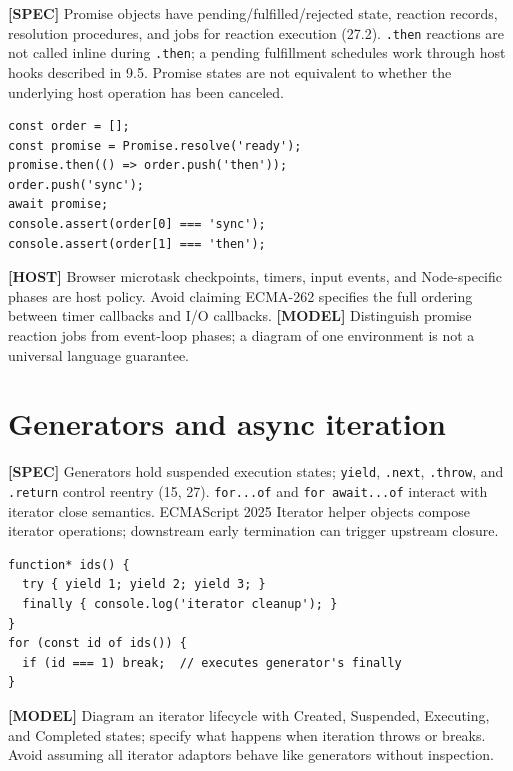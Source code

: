 \documentclass[11pt,letterpaper]{article}
\newcommand{\passthrough}[1]{#1}
\begin{document}
\textbf{{[}SPEC{]}} Promise objects have pending/fulfilled/rejected state, reaction records, resolution procedures, and jobs for reaction execution (27.2). \passthrough{\lstinline!.then!} reactions are not called inline during \passthrough{\lstinline!.then!}; a pending fulfillment schedules work through host hooks described in 9.5. Promise states are not equivalent to whether the underlying host operation has been canceled.

\begin{lstlisting}
const order = [];
const promise = Promise.resolve('ready');
promise.then(() => order.push('then'));
order.push('sync');
await promise;
console.assert(order[0] === 'sync');
console.assert(order[1] === 'then');
\end{lstlisting}

\textbf{{[}HOST{]}} Browser microtask checkpoints, timers, input events, and Node-specific phases are host policy. Avoid claiming ECMA-262 specifies the full ordering between timer callbacks and I/O callbacks. \textbf{{[}MODEL{]}} Distinguish promise reaction jobs from event-loop phases; a diagram of one environment is not a universal language guarantee.

\section{Generators and async iteration}\label{generators-and-async-iteration}

\textbf{{[}SPEC{]}} Generators hold suspended execution states; \passthrough{\lstinline!yield!}, \passthrough{\lstinline!.next!}, \passthrough{\lstinline!.throw!}, and \passthrough{\lstinline!.return!} control reentry (15, 27). \passthrough{\lstinline!for...of!} and \passthrough{\lstinline!for await...of!} interact with iterator close semantics. ECMAScript 2025 Iterator helper objects compose iterator operations; downstream early termination can trigger upstream closure.

\begin{lstlisting}
function* ids() {
  try { yield 1; yield 2; yield 3; }
  finally { console.log('iterator cleanup'); }
}
for (const id of ids()) {
  if (id === 1) break;  // executes generator's finally
}
\end{lstlisting}

\textbf{{[}MODEL{]}} Diagram an iterator lifecycle with Created, Suspended, Executing, and Completed states; specify what happens when iteration throws or breaks. Avoid assuming all iterator adaptors behave like generators without inspection.
\end{document}
